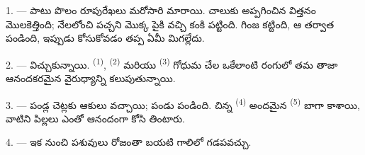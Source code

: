%
%
%


\VUsaut{5.0mm}
\VUsaut{3.0mm}
\VUsaut{3.0mm}
\VUsaut{4.0mm}
\VUsaut{3.0mm}

1. ---  పాటు పొలం రూపురేఖలు మరోసారి మారాయి. చాలుకు అప్పగించిన విత్తనం
మొలకెత్తింది; నేలలోంచి పచ్చని మొక్క పైకి వచ్చి కంకి పట్టింది. గింజ కట్టింది, ఆ తర్వాత పండింది,
ఇప్పుడు కోసుకోవడం తప్ప ఏమీ మిగల్లేదు.

2. ---  విచ్చుకున్నాయి.  \textsuperscript{(1)},
 \textsuperscript{(2)} మరియు  \textsuperscript{(3)}
గోధుమ చేల ఒకేలాంటి రంగులో తమ తాజా  ఆనందకరమైన వైరుధ్యాన్ని కలుపుతున్నాయి.

3. --- పండ్ల చెట్లకు ఆకులు వచ్చాయి; పండు పండింది. చిన్న 
\textsuperscript{(4)} అందమైన  \textsuperscript{(5)} బాగా కాశాయి, వాటిని
పిల్లలు ఎంతో ఆనందంగా కోసి తింటారు.

4. --- ఇక నుంచి పశువులు రోజంతా బయటి గాలిలో గడపవచ్చు.

